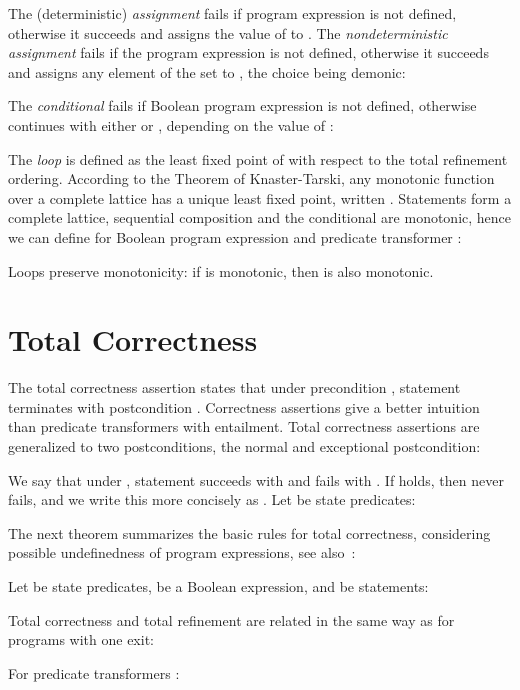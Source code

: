 \documentclass[submission,copyright,creativecommons]{eptcs}
\begin{document}
The (deterministic) \emph{assignment}  fails if program expression  is not defined, otherwise it succeeds and assigns the value of  to . The {\em nondeterministic assignment}  fails if the program expression  is not defined, otherwise it succeeds and assigns any element of the set  to , the choice being demonic:

The {\em conditional}  fails if Boolean program expression  is not defined, otherwise continues with either  or , depending on the value of :

The {\em loop}  is defined as the least fixed point of  with respect to the total refinement ordering. According to the Theorem of Knaster-Tarski, any monotonic function  over a complete lattice has a unique least fixed point, written . Statements form a complete lattice, sequential composition and the conditional are monotonic, hence we can define for Boolean program expression  and predicate transformer :

Loops preserve monotonicity: if  is monotonic, then  is also monotonic.

\section{Total Correctness}
\label{sec:toco}

The total correctness assertion  states that under precondition , statement  terminates with postcondition . Correctness assertions give a better intuition than predicate transformers with entailment. Total correctness assertions are  generalized to two postconditions, the normal and exceptional postcondition:

We say that under , statement  succeeds with  and fails with . If  holds, then  never fails, and we write this more concisely as . Let  be state predicates:

The next theorem summarizes the basic rules for total correctness, considering possible undefinedness of program expressions, see also~\cite{Cristian84CorrectRobustPrograms,Jacobs01FormalisationJavaExceptions, KingMorgan95ExitsInRefinementCalculus, LeinoSnepscheut94SemanticsExceptions}:
\begin{theorem} Let  be state predicates,  be a Boolean expression, and  be statements:

\end{theorem}
Total correctness and total refinement are related in the same way as for programs with one exit:
\begin{theorem}
\label{thm:total_rel}
For predicate transformers :

\end{theorem}
\end{document}
